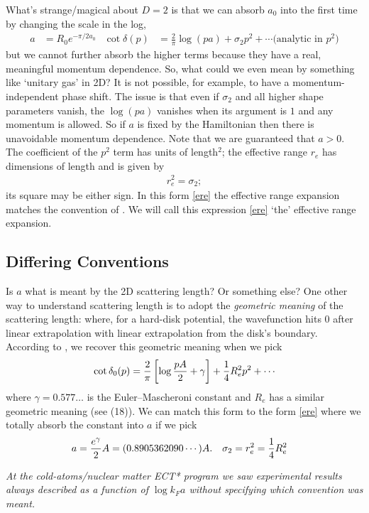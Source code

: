 What's strange/magical about $D=2$ is that we can absorb $a_0$ into the first time by changing the scale in the log,
\begin{align}
	a &= R_0 e^{-\pi/2a_0}
	&
	\cot \delta(p)
	&=
			\frac{2}{\pi} \log(p a)
		+	\sigma_2 p^2
		+	\cdots \text{(analytic in }p^2)
	\label{eq:ere}
\end{align}
but we cannot further absorb the higher terms because they have a real, meaningful momentum dependence.
So, what could we even mean by something like `unitary gas' in 2D?
It is not possible, for example, to have a momentum-independent phase shift.
The issue is that even if $\sigma_2$ and all higher shape parameters vanish, the $\log(pa)$ vanishes when its argument is $1$ and any momentum is allowed.
So if $a$ is fixed by the Hamiltonian then there is unavoidable momentum dependence.
Note that we are guaranteed that $a>0$.
The coefficient of the $p^2$ term has units of length${}^2$; the effective range $r_e$ has dimensions of length and is given by
\begin{align}
	r_e^2 = \sigma_2;
\end{align}
its square may be either sign.
In this form \eqref{ere} the effective range expansion matches the convention of .
We will call this expression \eqref{ere} `the' effective range expansion.

\subsection{Differing Conventions}

Is $a$ what is meant by the 2D scattering length?  Or something else?
One other way to understand scattering length is to adopt the \emph{geometric meaning} of the scattering length: where, for a hard-disk potential, the wavefunction hits 0 after linear extrapolation  with linear extrapolation from the disk's boundary.
According to , we recover this geometric meaning when we pick
\begin{align}
	\cot \delta_0(p) = \frac{2}{\pi}\left[\log \frac{pA}{2} + \gamma\right] + \frac{1}{4} R_e^2 p^2 + \cdots
	\label{eq:ere in the hard-disk convention}
\end{align}
where $\gamma = 0.577\ldots$ is the Euler–Mascheroni constant and $R_e$ has a similar geometric meaning (see  (18)).
We can match this form to the form \eqref{ere} where we totally absorb the constant into $a$ if we pick
\begin{align}
	a &= \frac{e^{\gamma}}{2} A = (0.8905362090\cdots) A.
	&
	\sigma_2 = r_e^2 &= \frac{1}{4} R_e^2
\end{align}

\emph{At the cold-atoms/nuclear matter ECT* program we saw experimental results always described as a function of $\log k_F a$ without specifying which convention was meant.}
